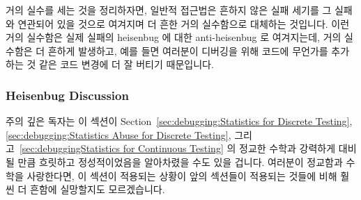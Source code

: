 거의 실수를 세는 것을 정리하자면, 일반적 접근법은 흔하지 않은 실패 세기를 그
실패와 연관되어 있을 것으로 여겨지며 더 흔한 거의 실수함으로 대체하는 것입니다.
이런 거의 실수함은 실제 실패의 heisenbug 에 대한 anti-heisenbug 로 여겨지는데,
거의 실수함은 더 흔하게 발생하고, 예를 들면 여러분이 디버깅을 위해 코드에
무언가를 추가하는 것 같은 코드 변경에 더 잘 버티기 때문입니다.

\subsubsection{Heisenbug Discussion}
\label{sec:debugging:Heisenbug Discussion}

주의 깊은 독자는 이 섹션이
Section~\ref{sec:debugging:Statistics for Discrete Testing},
\ref{sec:debugging:Statistics Abuse for Discrete Testing},
그리고~\ref{sec:debuggingStatistics for Continuous Testing} 의 정교한 수학과
강력하게 대비될 만큼 흐릿하고 정성적이었음을 알아차렸을 수도 있을 겁니다.
여러분이 정교함과 수학을 사랑한다면, 이 섹션이 적용되는 상황이 앞의 섹션들이
적용되는 것들에 비해 훨씬 더 흔함에 실망할지도 모르겠습니다.

